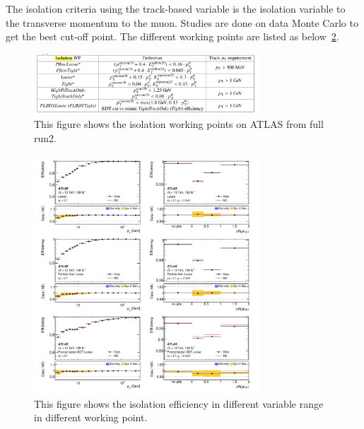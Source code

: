 The isolation criteria using the track-based variable is the isolation variable to the transverse momentum to the muon. Studies are done on data Monte Carlo to get the best cut-off point. The different working points are listed as below~\ref{fig:isolationWP}.


\begin{figure}[!htb]
    \begin{center}
        \includegraphics[width=0.75\textwidth]{figures/common_ana/Isolation}
        \caption 
        {
            This figure shows the isolation working points on ATLAS from full run2\cite{Aad:2746302}.}
        \label{fig:isolationWP}
    \end{center}
\end{figure}

\begin{figure}[!htb]
    \begin{center}
        \includegraphics[width=0.75\textwidth]{figures/common_ana/IsolationEff1}
        \caption{
            This figure shows the isolation efficiency in different variable range in different working point\cite{Aad:2746302}.
        }
        \label{fig:isolationWP}
    \end{center}
\end{figure}



